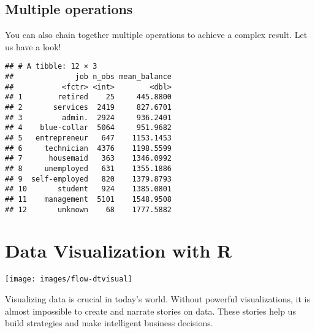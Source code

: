 \documentclass[]{book}
\newenvironment{Shaded}{\begin{snugshade}}{\end{snugshade}}
\newcommand{\KeywordTok}[1]{\textcolor[rgb]{0.13,0.29,0.53}{\textbf{{#1}}}}
\newcommand{\DataTypeTok}[1]{\textcolor[rgb]{0.13,0.29,0.53}{{#1}}}
\newcommand{\DecValTok}[1]{\textcolor[rgb]{0.00,0.00,0.81}{{#1}}}
\newcommand{\StringTok}[1]{\textcolor[rgb]{0.31,0.60,0.02}{{#1}}}
\newcommand{\CommentTok}[1]{\textcolor[rgb]{0.56,0.35,0.01}{\textit{{#1}}}}
\newcommand{\OtherTok}[1]{\textcolor[rgb]{0.56,0.35,0.01}{{#1}}}
\newcommand{\NormalTok}[1]{{#1}}
\begin{document}
\section{Multiple operations}\label{multiple-operations}

You can also chain together multiple operations to achieve a complex
result. Let us have a look!

\begin{Shaded}
\end{Shaded}

\begin{verbatim}
## # A tibble: 12 × 3
##              job n_obs mean_balance
##           <fctr> <int>        <dbl>
## 1        retired    25     445.8800
## 2       services  2419     827.6701
## 3         admin.  2924     936.2401
## 4    blue-collar  5064     951.9682
## 5   entrepreneur   647    1153.1453
## 6     technician  4376    1198.5599
## 7      housemaid   363    1346.0992
## 8     unemployed   631    1355.1886
## 9  self-employed   820    1379.8793
## 10       student   924    1385.0801
## 11    management  5101    1548.9508
## 12       unknown    68    1777.5882
\end{verbatim}

\chapter{Data Visualization with R}\label{data-visualization-with-r}

\texttt{[image: images/flow-dtvisual]}

Visualizing data is crucial in today's world. Without powerful
visualizations, it is almost impossible to create and narrate stories on
data. These stories help us build strategies and make intelligent
business decisions.
\end{document}
